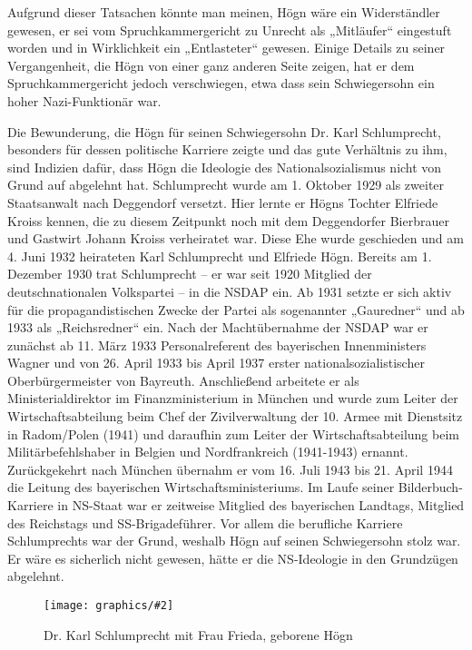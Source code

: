 \documentclass{book}
\newcommand{\img}[2][width=\linewidth]{\noindent\texttt{[image: graphics/\#2]}}
\begin{document}
Aufgrund dieser Tatsachen könnte man meinen, Högn wäre ein
Widerständler gewesen, er sei vom Spruchkammergericht zu Unrecht als
„Mitläufer“ eingestuft worden und in Wirklichkeit ein „Entlasteter“
gewesen. Einige Details zu seiner Vergangenheit, die Högn von einer
ganz anderen Seite zeigen, hat er dem Spruchkammergericht jedoch
verschwiegen, etwa dass sein Schwiegersohn ein hoher Nazi-Funktionär
war.

Die Bewunderung, die Högn für seinen Schwiegersohn Dr. Karl
Schlumprecht, besonders für dessen politische Karriere zeigte und das
gute Verhältnis zu ihm, sind Indizien dafür, dass Högn die Ideologie
des Nationalsozialismus nicht von Grund auf abgelehnt hat. Schlumprecht
wurde am 1. Oktober 1929 als zweiter Staatsanwalt nach Deggendorf
versetzt. Hier lernte er Högns Tochter Elfriede Kroiss kennen, die zu
diesem Zeitpunkt noch mit dem Deggendorfer Bierbrauer und Gastwirt
Johann Kroiss verheiratet war. Diese Ehe wurde geschieden und am 4.
Juni 1932 heirateten Karl Schlumprecht und Elfriede Högn. Bereits am 1.
Dezember 1930 trat Schlumprecht – er war seit 1920 Mitglied der
deutschnationalen Volkspartei – in die NSDAP ein. Ab 1931 setzte er
sich aktiv für die pro\-pa\-gan\-di\-sti\-schen Zwecke der Partei als
sogenannter „Gauredner“ und ab 1933 als „Reichsredner“ ein. Nach der
Machtübernahme der NSDAP war er zunächst ab 11. März 1933
Personalreferent des bayerischen Innenministers Wagner und von 26.
April 1933 bis April 1937 erster nationalsozialistischer
Oberbürgermeister von Bayreuth. Anschließend arbeitete er als
Ministerialdirektor im Finanzministerium in München und wurde zum
Leiter der Wirtschaftsabteilung beim Chef der Zivilverwaltung der 10.
Armee mit Dienstsitz in Radom/Polen (1941) und daraufhin zum Leiter der
Wirtschaftsabteilung beim Militärbefehlshaber in Belgien und
Nordfrankreich (1941-1943) ernannt. Zurückgekehrt nach München
übernahm er vom 16. Juli 1943 bis 21. April 1944 die Leitung des
bayerischen Wirtschaftsministeriums. Im Laufe seiner
Bilderbuch-Karriere in NS-Staat war er zeitweise Mitglied des
bayerischen Landtags, Mitglied des Reichstags und SS-Brigadeführer.
Vor allem die berufliche Karriere Schlumprechts war der Grund,
weshalb Högn auf seinen Schwiegersohn stolz war. Er wäre es
sicherlich nicht gewesen, hätte er die NS-Ideologie in den Grundzügen
abgelehnt.

\begin{figure}
\img{Karl-Schlumprecht.jpg}
\caption{Dr. Karl Schlumprecht mit Frau Frieda, geborene Högn}
\end{figure}
\end{document}
